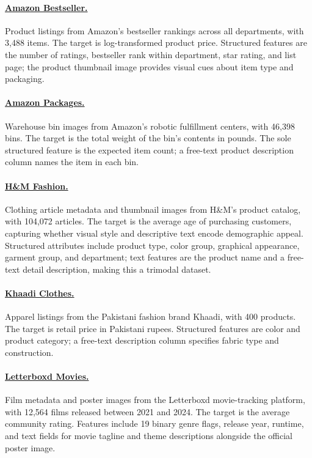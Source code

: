 \paragraph{\href{https://www.kaggle.com/datasets/amankumar20d/amazon-best-seller-all-departments-us}{Amazon Bestseller.}} Product listings from Amazon's bestseller rankings across all departments, with 3,488 items.
The target is log-transformed product price.
Structured features are the number of ratings, bestseller rank within department, star rating, and list page; the product thumbnail image provides visual cues about item type and packaging.

\paragraph{\href{https://www.kaggle.com/datasets/dhruvildave/amazon-bin-image-dataset}{Amazon Packages.}} Warehouse bin images from Amazon's robotic fulfillment centers, with 46,398 bins.
The target is the total weight of the bin's contents in pounds.
The sole structured feature is the expected item count; a free-text product description column names the item in each bin.

\paragraph{\href{https://www.kaggle.com/datasets/odins0n/handm-dataset-128x128}{H\&M Fashion.}} Clothing article metadata and thumbnail images from H\&M's product catalog, with 104,072 articles.
The target is the average age of purchasing customers, capturing whether visual style and descriptive text encode demographic appeal.
Structured attributes include product type, color group, graphical appearance, garment group, and department; text features are the product name and a free-text detail description, making this a trimodal dataset.

\paragraph{\href{https://www.kaggle.com/datasets/usman8/khaadis-clothes-data-with-images}{Khaadi Clothes.}} Apparel listings from the Pakistani fashion brand Khaadi, with 400 products.
The target is retail price in Pakistani rupees.
Structured features are color and product category; a free-text description column specifies fabric type and construction.

\paragraph{\href{https://www.kaggle.com/datasets/gsimonx37/letterboxd}{Letterboxd Movies.}} Film metadata and poster images from the Letterboxd movie-tracking platform, with 12,564 films released between 2021 and 2024.
The target is the average community rating.
Features include 19 binary genre flags, release year, runtime, and text fields for movie tagline and theme descriptions alongside the official poster image.

